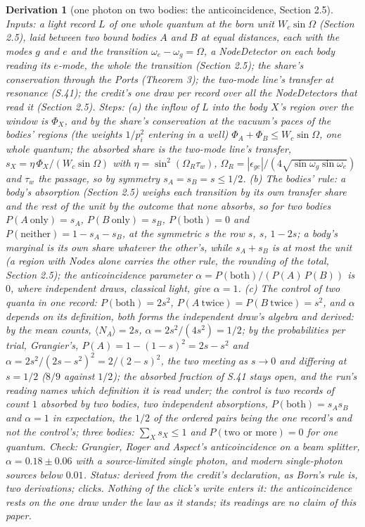 \documentclass[pdflatex,sn-mathphys-num]{sn-jnl}
\newcommand{\Wc}{W_c}
\theoremstyle{thmstyleone}
\newtheorem{derivation}{Derivation}
\renewcommand{\thederivation}{S.\arabic{derivation}}
\begin{document}
\renewcommand{\thederivation}{C.\arabic{derivation}}\setcounter{derivation}{7}
\begin{derivation}[one photon on two bodies: the anticoincidence, Section 2.5]
\emph{Inputs:} a light record $L$ of one whole quantum at the born unit $\Wc\sin\Omega$ (Section 2.5), laid between two bound bodies $A$ and $B$ at equal distances, each with the modes $g$ and $e$ and the transition $\omega_e - \omega_g = \Omega$, a NodeDetector on each body reading its $e$-mode, the whole the transition (Section 2.5); the share's conservation through the Ports (Theorem 3); the two-mode line's transfer at resonance (S.41); the credit's one draw per record over all the NodeDetectors that read it (Section 2.5). \emph{Steps:} (a) the inflow of $L$ into the body $X$'s region over the window is $\Phi_X$, and by the share's conservation at the vacuum's paces of the bodies' regions (the weights $1 / p_i^2$ entering in a well) $\Phi_A + \Phi_B \le \Wc\sin\Omega$, one whole quantum; the absorbed share is the two-mode line's transfer, $s_X = \eta\,\Phi_X / (\Wc\sin\Omega)$ with $\eta = \sin^2(\Omega_R\tau_w)$, $\Omega_R = |\epsilon_{ge}| / (4\sqrt{\sin\omega_g\sin\omega_e})$ and $\tau_w$ the passage, so by symmetry $s_A = s_B = s \le 1 / 2$. (b) The bodies' rule: a body's absorption (Section 2.5) weighs each transition by its own transfer share and the rest of the unit by the outcome that none absorbs, so for two bodies $P(A\ \text{only}) = s_A$, $P(B\ \text{only}) = s_B$, $P(\text{both}) = 0$ and $P(\text{neither}) = 1 - s_A - s_B$, at the symmetric $s$ the row $s$, $s$, $1 - 2s$; a body's marginal is its own share whatever the other's, while $s_A + s_B$ is at most the unit (a region with Nodes alone carries the other rule, the rounding of the total, Section 2.5); the anticoincidence parameter $\alpha = P(\text{both}) / (P(A)\,P(B))$ is $0$, where independent draws, classical light, give $\alpha = 1$. (c) The control of two quanta in one record: $P(\text{both}) = 2s^2$, $P(A\ \text{twice}) = P(B\ \text{twice}) = s^2$, and $\alpha$ depends on its definition, both forms the independent draw's algebra and derived: by the mean counts, $\langle N_A\rangle = 2s$, $\alpha = 2s^2 / (4s^2) = 1 / 2$; by the probabilities per trial, Grangier's, $P(A) = 1 - (1 - s)^2 = 2s - s^2$ and $\alpha = 2s^2 / (2s - s^2)^2 = 2 / (2 - s)^2$, the two meeting as $s \to 0$ and differing at $s = 1 / 2$ ($8 / 9$ against $1 / 2$); the absorbed fraction of S.41 stays open, and the run's reading names which definition it is read under; the control is two records of count $1$ absorbed by two bodies, two independent absorptions, $P(\text{both}) = s_A s_B$ and $\alpha = 1$ in expectation, the $1 / 2$ of the ordered pairs being the one record's and not the control's; three bodies: $\sum_X s_X \le 1$ and $P(\text{two or more}) = 0$ for one quantum. \emph{Check:} Grangier, Roger and Aspect's anticoincidence \cite{grangier} on a beam splitter, $\alpha = 0.18 \pm 0.06$ with a source-limited single photon, and modern single-photon sources below $0.01$. \emph{Status:} derived from the credit's declaration, as Born's rule is, two derivations; clicks. Nothing of the click's write enters it: the anticoincidence rests on the one draw under the law as it stands; its readings are no claim of this paper.

\end{derivation}
\end{document}
